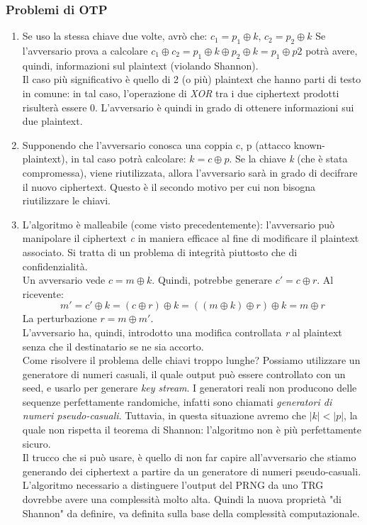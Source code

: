 \documentclass[a4paper,12pt]{article}
\begin{document}
\subsubsection{Problemi di OTP}
\begin{enumerate}
	\item Se uso la stessa chiave due volte, avrò che: $c_1 = p_1 \oplus k$, $c_2 = p_2 \oplus k$
	Se l'avversario prova a calcolare $c_1 \oplus c_2 = p_1 \oplus k \oplus p_2 \oplus k = p_1 \oplus p2$
	potrà avere, quindi, informazioni sul plaintext (violando Shannon). \\
	Il caso più significativo è quello di 2 (o più) plaintext che hanno parti di testo in comune:
	in tal caso, l'operazione di \textit{XOR} tra i due ciphertext prodotti risulterà essere 0.
	L'avversario è quindi in grado di ottenere informazioni sui due plaintext.
	\item Supponendo che l'avversario conosca una coppia c, p (attacco known-plaintext), in tal caso potrà calcolare:
	$k = c \oplus p$. Se la chiave \textit{k} (che è stata compromessa), viene riutilizzata, allora l'avversario sarà in grado 
	di decifrare il nuovo ciphertext. Questo è il secondo motivo per cui non bisogna riutilizzare le chiavi.
	\item L'algoritmo è malleabile (come visto precedentemente): l'avversario può manipolare il ciphertext \textit{c}
	in maniera efficace al fine di modificare il plaintext associato. Si tratta di un problema di integrità piuttosto che
	di confidenzialità. \\
	Un avversario vede $c = m \oplus k$. Quindi, potrebbe generare $c' = c \oplus r$.
	Al ricevente:
	$$ m' = c' \oplus k = (c \oplus r) \oplus k = ((m \oplus k) \oplus r) \oplus k = m \oplus r $$
	La perturbazione $r = m \oplus m'$. \\
	L'avversario ha, quindi, introdotto una modifica controllata \textit{r} al plaintext senza che
	il destinatario se ne sia accorto. \\
	Come risolvere il problema delle chiavi troppo lunghe? Possiamo utilizzare un generatore di numeri casuali, il quale output può essere controllato
	con un seed, e usarlo per generare \textit{key stream}. I generatori reali non producono delle sequenze perfettamente randomiche,
	infatti sono chiamati \textit{generatori di numeri pseudo-casuali}.
	Tuttavia, in questa situazione avremo che $|k| < |p|$, la quale non rispetta il teorema di Shannon:
	l'algoritmo non è più perfettamente sicuro. \\
	Il trucco che si può usare, è quello di non far capire all'avversario che stiamo generando dei ciphertext a partire da un generatore di numeri pseudo-casuali.
	L'algoritmo necessario a distinguere l'output del PRNG da uno TRG dovrebbe avere una complessità molto alta.
	Quindi la nuova proprietà "di Shannon" da definire, va definita sulla base della complessità computazionale.
\end{enumerate}
\end{document}

